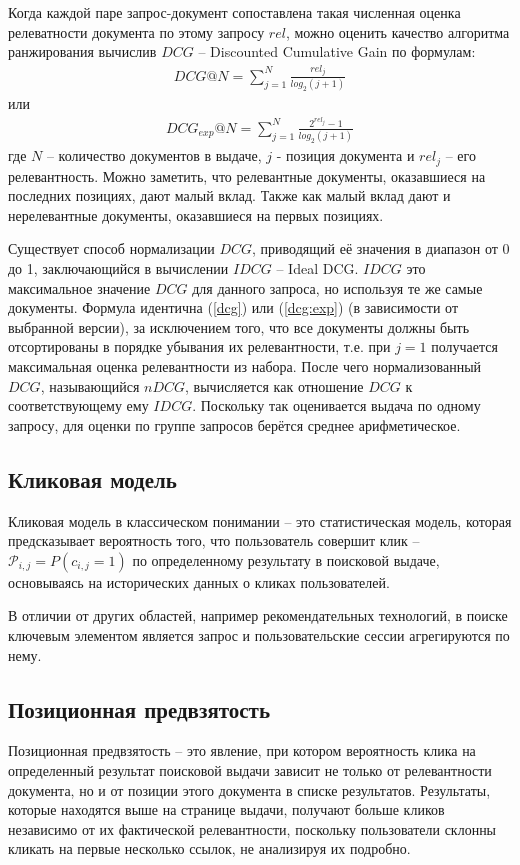 \documentclass[diploma]{nanolab2015}
\begin{document}
Когда каждой паре запрос-документ сопоставлена такая численная оценка релеватности документа по этому запросу $rel$, можно оценить качество алгоритма ранжирования вычислив $DCG$ -- Discounted Cumulative Gain по формулам:
\begin{align}
    DCG@N = \sum_{j=1}^{N} \frac{rel_j}{log_2(j+1)} \label{dcg}
\end{align}
или
\begin{align}
    DCG_{exp}@N = \sum_{j=1}^{N} \frac{2^{rel_j} - 1}{log_2(j+1)} \label{dcg:exp}
\end{align}
где $N$ -- количество документов в выдаче, $j$ - позиция документа и $rel_j$ -- его релевантность. Можно заметить, что релевантные документы, оказавшиеся на последних позициях, дают малый вклад. Также как малый вклад дают и нерелевантные документы, оказавшиеся на первых позициях.

Существует способ нормализации $DCG$, приводящий её значения в диапазон от 0 до 1, заключающийся в вычислении $IDCG$ -- Ideal DCG. $IDCG$ это максимальное значение $DCG$ для данного запроса, но используя те же самые документы. Формула идентична (\ref{dcg}) или (\ref{dcg:exp}) (в зависимости от выбранной версии), за исключением того, что все документы должны быть отсортированы в порядке убывания их релевантности, т.е. при $j=1$ получается максимальная оценка релевантности из набора.
После чего нормализованный $DCG$, называющийся $nDCG$, вычисляется как отношение $DCG$ к соответствующему ему $IDCG$. Поскольку так оценивается выдача по одному запросу, для оценки по группе запросов берётся среднее арифметическое.

\subsection{Кликовая модель}
Кликовая модель в классическом понимании -- это статистическая модель, которая предсказывает вероятность того, что пользователь совершит клик -- $\mathcal{P}_{i,j} = P(c_{i,j} = 1)$ по определенному результату в поисковой выдаче, основываясь на исторических данных о кликах пользователей.

В отличии от других областей, например рекомендательных технологий, в поиске ключевым элементом является запрос и пользовательские сессии агрегируются по нему.

\subsection{Позиционная предвзятость}
Позиционная предвзятость -- это явление, при котором вероятность клика на определенный результат поисковой выдачи зависит не только от релевантности документа, но и от позиции этого документа в списке результатов. Результаты, которые находятся выше на странице выдачи, получают больше кликов независимо от их фактической релевантности, поскольку пользователи склонны кликать на первые несколько ссылок, не анализируя их подробно.
\end{document}

